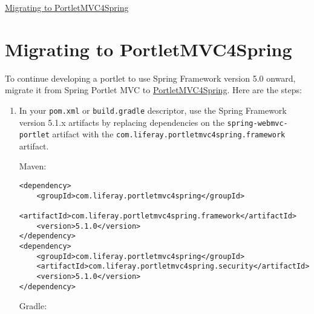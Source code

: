 \href{/docs/7-2/appdev/-/knowledge_base/a/migrating-to-portletmvc4spring}{Migrating
to PortletMVC4Spring}

\chapter{Migrating to
PortletMVC4Spring}\label{migrating-to-portletmvc4spring}

To continue developing a portlet to use Spring Framework version 5.0
onward, migrate it from Spring Portlet MVC to
\href{/docs/7-2/appdev/-/knowledge_base/a/portletmvc4spring}{PortletMVC4Spring}.
Here are the steps:

\begin{enumerate}
\def\labelenumi{\arabic{enumi}.}
\item
  In your \texttt{pom.xml} or \texttt{build.gradle} descriptor, use the
  Spring Framework version 5.1.x artifacts by replacing dependencies on
  the \texttt{spring-webmvc-portlet} artifact with the
  \texttt{com.liferay.portletmvc4spring.framework} artifact.

  Maven:

\begin{verbatim}
<dependency>
    <groupId>com.liferay.portletmvc4spring</groupId>
    <artifactId>com.liferay.portletmvc4spring.framework</artifactId>
    <version>5.1.0</version>    
</dependency>
<dependency>
    <groupId>com.liferay.portletmvc4spring</groupId>
    <artifactId>com.liferay.portletmvc4spring.security</artifactId>
    <version>5.1.0</version>    
</dependency>
\end{verbatim}

  Gradle:


\end{enumerate}

